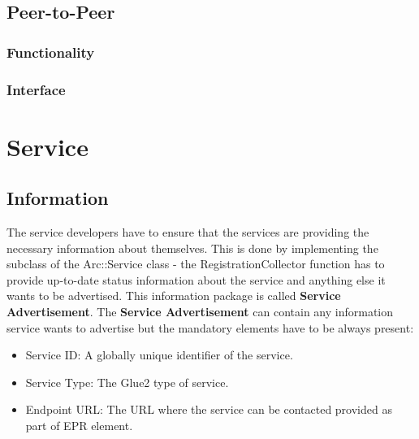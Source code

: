 \documentclass{book}
\begin{document}
\section{Peer-to-Peer} %
\label{sec:peer_to_peer}

\subsection{Functionality} %
\label{sub:p2p_functionality}


\subsection{Interface} %
\label{sub:p2p_interface}




\chapter{Service} %
\label{cha:service}

\section{Information} %
\label{sec:service_information}

The service developers have to ensure that the services are providing the necessary information about themselves. This is done by implementing the subclass of the Arc::Service class - the RegistrationCollector function has to provide up-to-date status information about the service and anything else it wants to be advertised. This information package is called \textbf{Service Advertisement}.
\label{service_advertisement}
The \textbf{Service Advertisement} can contain any information service wants to advertise but the mandatory elements have to be always present:
\begin{itemize}
  \item Service ID: A globally unique identifier of the service.
  \item Service Type: The Glue2 type of service.
  \item Endpoint URL: The URL where the service can be contacted provided as part of EPR element.
\end{itemize}
\end{document}
